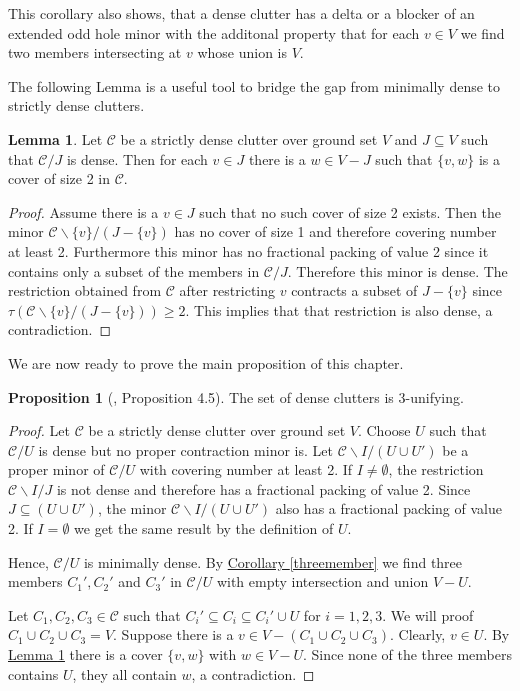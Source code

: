 \documentclass[a4paper, 12pt]{scrbook}
\theoremstyle{definition}
\newtheorem{lemma}[theorem]{Lemma}
\newtheorem{proposition}[theorem]{Proposition}
\begin{document}
   This corollary also shows, that a dense clutter has a delta or a blocker of an extended odd hole minor with the additonal property that for each $v \in V$ we find two members intersecting at $v$ whose union is $V$.

   The following Lemma is a useful tool to bridge the gap from minimally dense to strictly dense clutters.
   \begin{lemma}\label{covers}
       Let $\mathcal{C}$ be a strictly dense clutter over ground set $V$ and $J \subseteq V$ such that $\mathcal{C} / J$ is dense.
       Then for each $v \in J$ there is a $w \in V-J$ such that $\{v,w\}$ is a cover of size 2 in $\mathcal{C}$.
   \end{lemma}

   \begin{proof}
       Assume there is a $v \in J$ such that no such cover of size 2 exists.
       Then the minor $\mathcal{C} \backslash \{v\} / (J-\{v\})$ has no cover of size 1 and therefore covering number at least 2.
       Furthermore this minor has no fractional packing of value 2 since it contains only a subset of the members in $\mathcal{C} / J$.
       Therefore this minor is dense.
       The restriction obtained from $\mathcal{C}$ after restricting $v$ contracts a subset of $J-\{v\}$ since $\tau(\mathcal{C} \backslash \{v\} / (J-\{v\}))\geq 2$.
       This implies that that restriction is also dense, a contradiction.
   \end{proof}

   We are now ready to prove the main proposition of this chapter.
   \begin{proposition}[\cite{restrictions}, Proposition 4.5]
       The set of dense clutters is 3-unifying.
   \end{proposition}

   \begin{proof}
       Let $\mathcal{C}$ be a strictly dense clutter over ground set $V$.
       Choose $U$ such that $\mathcal{C} / U$ is dense but no proper contraction minor is.
       Let $\mathcal{C} \backslash I / (U \cup U')$ be a proper minor of $\mathcal{C} /U$ with covering number at least 2.
       If $I \neq \emptyset$, the restriction $\mathcal{C} \backslash I / J$ is not dense and therefore has a fractional packing of value 2.
       Since $J \subseteq (U \cup U')$, the minor $\mathcal{C} \backslash I / (U \cup U')$ also has a fractional packing of value 2.
       If $I=\emptyset$ we get the same result by the definition of $U$.

       Hence, $\mathcal{C}/U$ is minimally dense.
       By \hyperref[threemember]{Corollary \ref*{threemember}} we find three members $C_1', C_2'$ and $C_3'$ in $\mathcal{C}/U$ with empty intersection and union $V - U$.

       Let $C_1, C_2, C_3 \in \mathcal{C}$ such that $C_i' \subseteq C_i \subseteq C_i' \cup U$ for $i=1,2,3$.
       We will proof $C_1 \cup C_2 \cup C_3 = V$.
       Suppose there is a $v \in V-(C_1 \cup C_2 \cup C_3)$.
       Clearly, $v \in U$.
       By \hyperref[covers]{Lemma \ref*{covers}} there is a cover $\{v,w\}$ with $w \in V-U$.
       Since none of the three members contains $U$, they all contain $w$, a contradiction.
   \end{proof}
\end{document}
